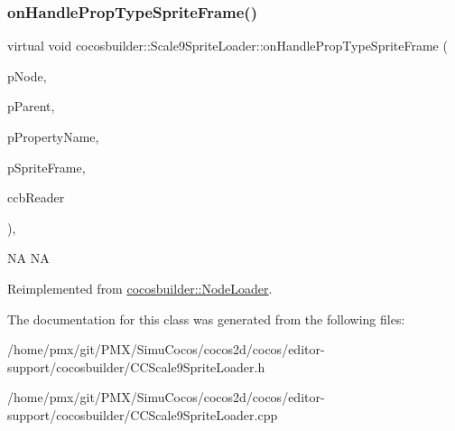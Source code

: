 \subsubsection{\texorpdfstring{on\+Handle\+Prop\+Type\+Sprite\+Frame()}{onHandlePropTypeSpriteFrame()}\hspace{0.1cm}{\footnotesize\ttfamily [2/2]}}
{\footnotesize\ttfamily virtual void cocosbuilder\+::\+Scale9\+Sprite\+Loader\+::on\+Handle\+Prop\+Type\+Sprite\+Frame (\begin{DoxyParamCaption}\item[{cocos2d\+::\+Node $\ast$}]{p\+Node,  }\item[{cocos2d\+::\+Node $\ast$}]{p\+Parent,  }\item[{const char $\ast$}]{p\+Property\+Name,  }\item[{cocos2d\+::\+Sprite\+Frame $\ast$}]{p\+Sprite\+Frame,  }\item[{\hyperlink{classcocosbuilder_1_1CCBReader}{C\+C\+B\+Reader} $\ast$}]{ccb\+Reader }\end{DoxyParamCaption})\hspace{0.3cm}{\ttfamily [protected]}, {\ttfamily [virtual]}}

NA  NA 

Reimplemented from \hyperlink{classcocosbuilder_1_1NodeLoader}{cocosbuilder\+::\+Node\+Loader}.



The documentation for this class was generated from the following files\+:\begin{DoxyCompactItemize}
\item 
/home/pmx/git/\+P\+M\+X/\+Simu\+Cocos/cocos2d/cocos/editor-\/support/cocosbuilder/C\+C\+Scale9\+Sprite\+Loader.\+h\item 
/home/pmx/git/\+P\+M\+X/\+Simu\+Cocos/cocos2d/cocos/editor-\/support/cocosbuilder/C\+C\+Scale9\+Sprite\+Loader.\+cpp\end{DoxyCompactItemize}
